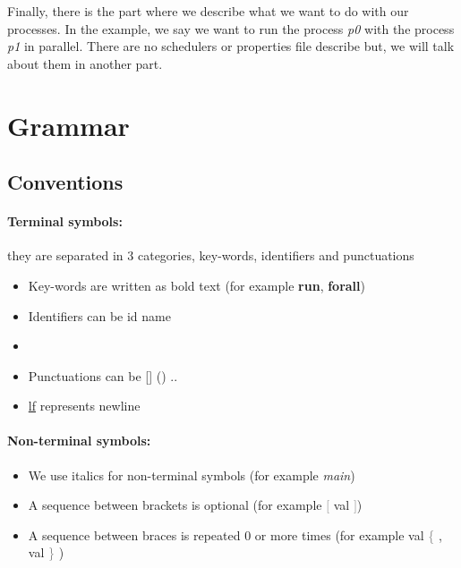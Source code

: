 \documentclass{article}
\begin{document}
Finally, there is the part where we describe what we want to do with our processes. In the example, we say we want to run the process \textit{p0} with the process \textit{p1} in parallel. There are no schedulers or properties file describe but, we will talk about them in another part.


\newpage

\section{Grammar}
\subsection{Conventions}
\paragraph{Terminal symbols:} they are separated in 3 categories, key-words, identifiers and punctuations
\begin{itemize}
  \item Key-words are written as bold text (for example \textbf{run}, \textbf{forall})
  \item Identifiers can be id name
  \item {}
  \item Punctuations can be [] () {}..
  \item \underline{lf} represents newline
\end{itemize}

\paragraph{Non-terminal symbols:}
\begin{itemize}
  \item We use italics for non-terminal symbols (for example \textit{main})
  \item A sequence between brackets is optional (for example \textcolor{gray}{$[$} val \textcolor{gray}{$]$})
  \item A sequence between braces is repeated 0 or more times (for example val \textcolor{gray}{\{} , val \textcolor{gray}{\}} )
\end{itemize}
\end{document}

